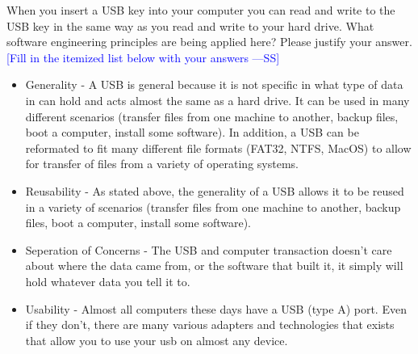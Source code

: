 \documentclass[12pt,fleqn]{examtst}
\newcommand{\authornote}[3]{\textcolor{#1}{[#3 ---#2]}}
\newcommand{\authornote}[3]{}
\newcommand{\wss}[1]{\authornote{blue}{SS}{#1}}
\begin{document}

\newpage

 When you insert a USB key into your computer you can read and
write to the USB key in the same way as you read and write to your hard drive. What
software engineering principles are being applied here? Please justify your
answer.\\

\noindent \wss{Fill in the itemized list below with your answers}

\begin{itemize}
\item Generality - A USB is general because it is not specific in what type
of data in can hold and acts almost the same as a hard drive. It can be used in
many different scenarios (transfer files from one machine to another,
backup files, boot a computer, install some software). In addition, a USB can
be reformated to fit many different file formats (FAT32, NTFS, MacOS) to allow
for transfer of files from a variety of operating systems.
\item Reusability - As stated above, the generality of a USB allows it to be
reused in a variety of scenarios (transfer files from one machine to another,
backup files, boot a computer, install some software).
\item Seperation of Concerns - The USB and computer transaction doesn't care
about where the data came from, or the software that built it, it simply will
hold whatever data you tell it to.
\item Usability - Almost all computers these days have a USB (type A) port. Even
if they don't, there are many various adapters and technologies that exists that
allow you to use your usb on almost any device.
\end{itemize}


\newpage
\end{document}
